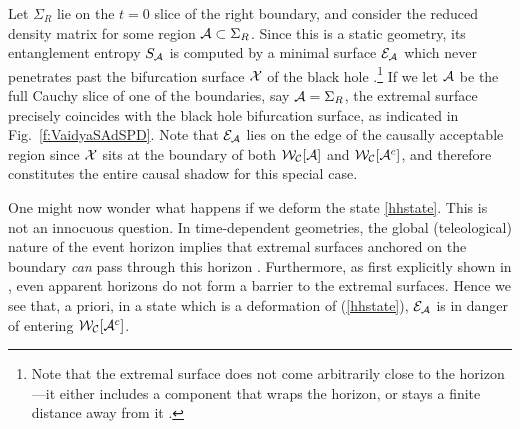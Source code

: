 \documentclass[12pt]{article}
\def\regA{{\cal A}}
\def\regAc{{\cal A}^c}
\def\extr{{\cal E}_\regA}
\def\CWA{{\cal W}_{\cal C}[\regA]}
\def\CWAc{{\cal W}_{\cal C}[{\regAc}]}
\begin{document}
Let $\Sigma_R$ lie on the $t=0$ slice of the right boundary, and consider the reduced density matrix for some region $\regA \subset \Sigma_{R}$. Since this is a static geometry, its entanglement entropy $S_\regA$ is computed by a minimal surface $\extr$ which never penetrates past the bifurcation surface ${\cal X}$ of the black hole \cite{Hubeny:2012ry}.\footnote{ Note that the extremal surface does not come arbitrarily close to the horizon---it either includes a component that wraps the horizon, or stays a finite distance away from it \cite{Hubeny:2013gta}.} If we let $\regA$ be the full Cauchy slice of one of the boundaries, say $\regA = \Sigma_R$, the extremal surface  precisely coincides with the black hole bifurcation surface, as indicated in Fig.\ \ref{f:VaidyaSAdSPD}.  Note that $\extr$ lies on the edge of the causally acceptable region since ${\cal X}$ sits at the boundary of both $\CWA$ and $\CWAc$, and therefore constitutes the entire causal shadow for this special case.  

One might now wonder what happens if we deform the state \eqref{hhstate}. This is not an innocuous question. In time-dependent geometries, the global (teleological) nature of the event horizon implies that extremal surfaces anchored on the boundary {\it can} pass through this horizon \cite{Hubeny:2002dg}. Furthermore, as first explicitly shown in \cite{AbajoArrastia:2010yt}, even apparent horizons do not form a barrier to the extremal surfaces. Hence we see that, a priori, in a state which is a deformation of (\ref{hhstate}), $\extr$ is in danger of entering $\CWAc$.
\end{document}
